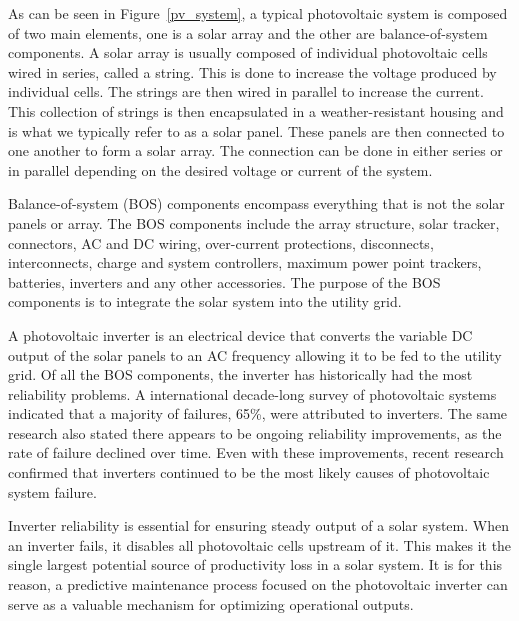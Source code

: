 As can be seen in Figure~\ref{pv_system}, a typical photovoltaic system is composed of two main elements, one is a solar array and the other are balance-of-system components. A solar array is usually composed of individual photovoltaic cells wired in series, called a string. This is done to increase the voltage produced by individual cells. The strings are then wired in parallel to increase the current. This collection of strings is then encapsulated in a weather-resistant housing and is what we typically refer to as a solar panel. These panels are then connected to one another to form a solar array. The connection can be done in either series or in parallel depending on the desired voltage or current of the system. 

Balance-of-system (BOS) components encompass everything that is not the solar panels or array. The BOS components include the array structure, solar tracker, connectors, AC and DC wiring, over-current protections, disconnects, interconnects, charge and system controllers, maximum power point trackers, batteries, inverters and any other accessories. The purpose of the BOS components is to integrate the solar system into the utility grid.

A photovoltaic inverter is an electrical device that converts the variable DC output of the solar panels to an AC frequency allowing it to be fed to the utility grid. Of all the BOS components, the inverter has historically had the most reliability problems. A international decade-long survey of photovoltaic systems indicated that a majority of failures, 65\%, were attributed to inverters\cite{Laukamp2002}. The same research also stated there appears to be ongoing reliability improvements, as the rate of failure declined over time. Even with these improvements, recent research confirmed that inverters continued to be the most likely causes of photovoltaic system failure\cite{Golnas2013}. 

Inverter reliability is essential for ensuring steady output of a solar system. When an inverter fails, it disables all photovoltaic cells upstream of it. This makes it the single largest potential source of productivity loss in a solar system. It is for this reason, a predictive maintenance process focused on the photovoltaic inverter can serve as a valuable mechanism for optimizing operational outputs. 

